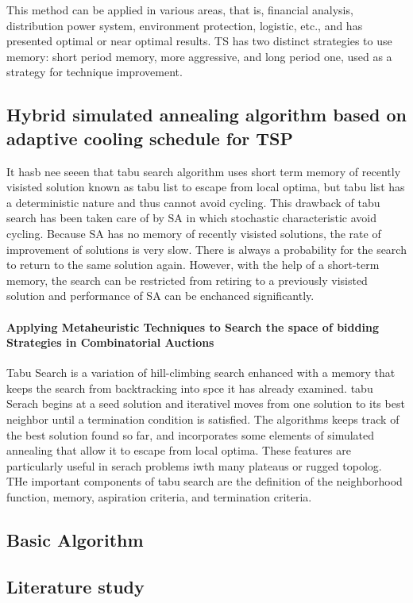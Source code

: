 This method can be applied in various areas, that is, financial analysis, distribution power system, environment protection, logistic, etc., and has presented optimal or near optimal results. TS has two distinct strategies to use memory: short period memory, more aggressive, and long period one, used as a strategy for technique improvement.

\subsection{Hybrid simulated annealing algorithm based on adaptive cooling schedule for TSP}
It hasb nee seeen that tabu search algorithm uses short term memory of recently visisted solution known as tabu list to escape from local optima, but tabu list has a deterministic nature and thus cannot avoid cycling. This drawback of tabu search has been taken care of by SA in which stochastic characteristic avoid cycling. Because SA has no memory of recently visisted solutions, the rate of improvement of solutions is very slow. There is always a probability for the search to return to the same solution again. However, with the help of a short-term memory, the search can be restricted from retiring to a previously visisted solution and performance of SA can be enchanced significantly.

\paragraph{Applying Metaheuristic Techniques to Search the space of bidding Strategies in Combinatorial Auctions}
Tabu Search is a variation of hill-climbing search enhanced with a memory that keeps the search from backtracking into spce it has already examined. tabu Serach begins at a seed solution and iterativel moves from one solution to its best neighbor until a termination condition is satisfied. The algorithms keeps track of the best solution found so far, and incorporates some elements of simulated annealing that allow it to escape from local optima. These features are particularly useful in serach problems iwth many plateaus  or rugged topolog. THe important components of tabu search are the definition of the neighborhood function, memory, aspiration criteria, and termination criteria.
\subsection{Basic Algorithm}

\subsection{Literature study}

